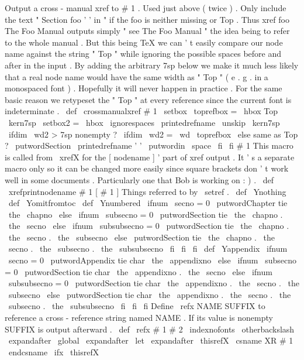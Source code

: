 {{{{{}
%
Output
a
cross
-
manual
xref
to
#
1
.
Used
just
above
(
twice
)
.
%
%
Only
include
the
text
"
Section
foo
'
'
in
"
if
the
foo
is
neither
%
missing
or
Top
.
Thus
xref
{
foo
The
Foo
Manual
}
outputs
simply
%
"
see
The
Foo
Manual
"
the
idea
being
to
refer
to
the
whole
manual
.
%
%
But
this
being
TeX
we
can
'
t
easily
compare
our
node
name
against
the
%
string
"
Top
"
while
ignoring
the
possible
spaces
before
and
after
in
%
the
input
.
By
adding
the
arbitrary
7sp
below
we
make
it
much
less
%
likely
that
a
real
node
name
would
have
the
same
width
as
"
Top
"
(
e
.
g
.
%
in
a
monospaced
font
)
.
Hopefully
it
will
never
happen
in
practice
.
%
%
For
the
same
basic
reason
we
retypeset
the
"
Top
"
at
every
%
reference
since
the
current
font
is
indeterminate
.
%
\
def
\
crossmanualxref
#
1
{
%
\
setbox
\
toprefbox
=
\
hbox
{
Top
\
kern7sp
}
%
\
setbox2
=
\
hbox
{
\
ignorespaces
\
printedrefname
\
unskip
\
kern7sp
}
%
\
ifdim
\
wd2
>
7sp
%
nonempty
?
\
ifdim
\
wd2
=
\
wd
\
toprefbox
\
else
%
same
as
Top
?
\
putwordSection
{
}
\
printedrefname
'
'
\
putwordin
{
}
\
space
\
fi
\
fi
#
1
%
}
%
This
macro
is
called
from
\
xrefX
for
the
[
nodename
]
'
part
of
xref
%
output
.
It
'
s
a
separate
macro
only
so
it
can
be
changed
more
easily
%
since
square
brackets
don
'
t
work
well
in
some
documents
.
Particularly
%
one
that
Bob
is
working
on
:
)
.
%
\
def
\
xrefprintnodename
#
1
{
[
#
1
]
}
%
Things
referred
to
by
\
setref
.
%
\
def
\
Ynothing
{
}
\
def
\
Yomitfromtoc
{
}
\
def
\
Ynumbered
{
%
\
ifnum
\
secno
=
0
\
putwordChapter
tie
\
the
\
chapno
\
else
\
ifnum
\
subsecno
=
0
\
putwordSection
tie
\
the
\
chapno
.
\
the
\
secno
\
else
\
ifnum
\
subsubsecno
=
0
\
putwordSection
tie
\
the
\
chapno
.
\
the
\
secno
.
\
the
\
subsecno
\
else
\
putwordSection
tie
\
the
\
chapno
.
\
the
\
secno
.
\
the
\
subsecno
.
\
the
\
subsubsecno
\
fi
\
fi
\
fi
}
\
def
\
Yappendix
{
%
\
ifnum
\
secno
=
0
\
putwordAppendix
tie
char
\
the
\
appendixno
{
}
%
\
else
\
ifnum
\
subsecno
=
0
\
putwordSection
tie
char
\
the
\
appendixno
.
\
the
\
secno
\
else
\
ifnum
\
subsubsecno
=
0
\
putwordSection
tie
char
\
the
\
appendixno
.
\
the
\
secno
.
\
the
\
subsecno
\
else
\
putwordSection
tie
char
\
the
\
appendixno
.
\
the
\
secno
.
\
the
\
subsecno
.
\
the
\
subsubsecno
\
fi
\
fi
\
fi
}
%
Define
\
refx
{
NAME
}
{
SUFFIX
}
to
reference
a
cross
-
reference
string
named
NAME
.
%
If
its
value
is
nonempty
SUFFIX
is
output
afterward
.
%
\
def
\
refx
#
1
#
2
{
%
{
%
\
indexnofonts
\
otherbackslash
\
expandafter
\
global
\
expandafter
\
let
\
expandafter
\
thisrefX
\
csname
XR
#
1
\
endcsname
}
%
\
ifx
\
thisrefX
}}}}}
